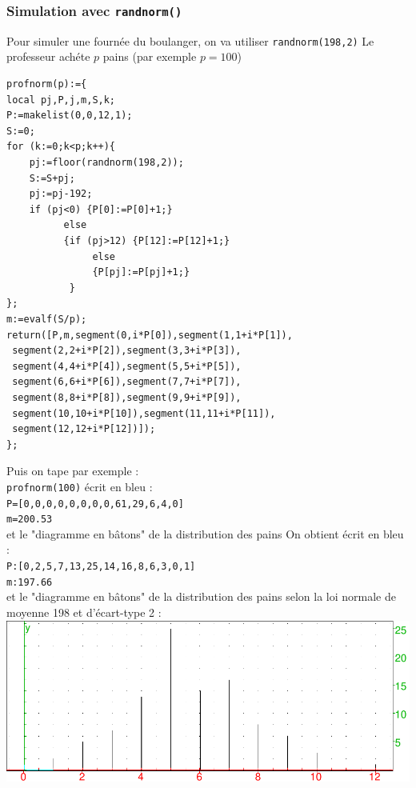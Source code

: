 \documentclass[a4paper,11pt]{book}
\begin{document}
\subsubsection{Simulation avec {\tt randnorm()}}
Pour simuler une fourn\'ee du boulanger, on va utiliser {\tt randnorm(198,2)}
Le professeur ach\'ete $p$ pains (par exemple $p=100$)
\begin{verbatim}
profnorm(p):={
local pj,P,j,m,S,k;
P:=makelist(0,0,12,1);
S:=0;
for (k:=0;k<p;k++){
    pj:=floor(randnorm(198,2));	
    S:=S+pj;
    pj:=pj-192;
    if (pj<0) {P[0]:=P[0]+1;} 
          else
          {if (pj>12) {P[12]:=P[12]+1;}
               else
               {P[pj]:=P[pj]+1;}
           }
};
m:=evalf(S/p);
return([P,m,segment(0,i*P[0]),segment(1,1+i*P[1]),
 segment(2,2+i*P[2]),segment(3,3+i*P[3]),
 segment(4,4+i*P[4]),segment(5,5+i*P[5]),
 segment(6,6+i*P[6]),segment(7,7+i*P[7]),
 segment(8,8+i*P[8]),segment(9,9+i*P[9]),
 segment(10,10+i*P[10]),segment(11,11+i*P[11]),
 segment(12,12+i*P[12])]);
};  
\end{verbatim}
Puis on tape par exemple :\\
{\tt profnorm(100)}
 \'ecrit en bleu :\\
{\tt P=[0,0,0,0,0,0,0,0,61,29,6,4,0]}\\
{\tt m=200.53}\\
et le "diagramme en b\^atons" de la distribution des pains 
On obtient \'ecrit en bleu :\\
{\tt P:[0,2,5,7,13,25,14,16,8,6,3,0,1]}\\
{\tt m:197.66}\\
et le "diagramme en b\^atons" de la distribution des pains selon la loi 
normale de moyenne 198 et d'\'ecart-type 2 :\\

\includegraphics[width=\textwidth]{pain4}
\end{document}
